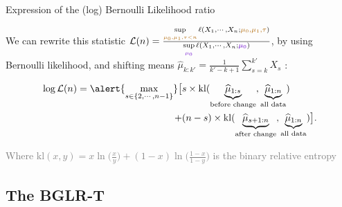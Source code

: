 \documentclass[11pt,french,ignorenonframetext,]{beamer}
\begin{document}
\begin{frame}{Expression of the (log) Bernoulli Likelihood ratio}

  We can rewrite this statistic
  $\mathcal{L}(n) = \frac{\sup\limits_{\textcolor{gold}{\mu_0,\mu_1,\tau < n}}\ell(X_1,\cdots,X_n ; \textcolor{gold}{\mu_0,\mu_1,\tau})}{\sup\limits_{\textcolor{deeppurple}{\mu_0}}\ell(X_1,\cdots,X_n ;\textcolor{deeppurple}{\mu_0})}$,
  by using Bernoulli likelihood, and shifting means $\widehat{\mu}_{k:k'} = \frac{1}{k'-k+1} \sum\limits_{s=k}^{k'} X_s$ :

  \begin{align*}
    \log \mathcal{L}(n) = \alert{\max_{s \in \{2,\cdots,n-1\}}} \bigl[
      & s \times \mathrm{kl} (\underbrace{\widehat{\mu}_{1:s}}_{\text{before change}},\underbrace{\widehat{\mu}_{1:n}}_{\text{all data}} ) \\
      + & (n-s) \times \mathrm{kl} (\underbrace{\widehat{\mu}_{s+1:n}}_{\text{after change}},\underbrace{\widehat{\mu}_{1:n}}_{\text{all data}} ) \bigr].
  \end{align*}

  \begin{small}
    \textcolor{gray}{Where $\mathrm{kl}(x,y) =x \ln\bigl(\frac{x}{y}\bigr) + (1-x)\ln\bigl(\frac{1-x}{1-y}\bigr)$ is the binary relative entropy}
  \end{small}

\end{frame}


\subsection{\hfill{}The BGLR-T\hfill{}}
\end{document}
